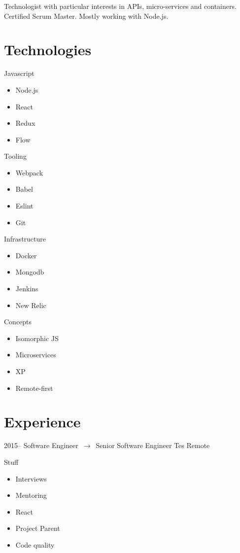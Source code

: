 \documentclass[10pt,a4paper,sans]{moderncv}
\date{11/08/2018}
\begin{document}
\makecvtitle

Technologist with particular interests in APIs, micro-services and containers. Certified Scrum Master. Mostly working with Node.js.

\section{Technologies}

\begin{cvcolumns}
  \cvcolumn
    {Javascript}
    {
      \begin{itemize}
        \item Node.js
        \item React
        \item Redux
        \item Flow
      \end{itemize}
    }

  \cvcolumn
    {Tooling}
    {
      \begin{itemize}
        \item Webpack
        \item Babel
        \item Eslint
        \item Git
      \end{itemize}
    }

  \cvcolumn
    {Infrastructure}
    {
      \begin{itemize}
        \item Docker
        \item Mongodb
        \item Jenkins
        \item New Relic
      \end{itemize}
    }

  \cvcolumn
    {Concepts}
    {
      \begin{itemize}
        \item Isomorphic JS
        \item Microservices
        \item XP
        \item Remote-first
      \end{itemize}
    }
\end{cvcolumns}

\section{Experience}

\cventry
  {2015--}
  {Software Engineer $\,\to\,$ Senior Software Engineer}
  {Tes}
  {Remote}
  {}
  {
    Stuff
    \begin{itemize}
      \item Interviews
      \item Mentoring
      \item React
      \item Project Parent
      \item Code quality
    \end{itemize}
  }
\end{document}
